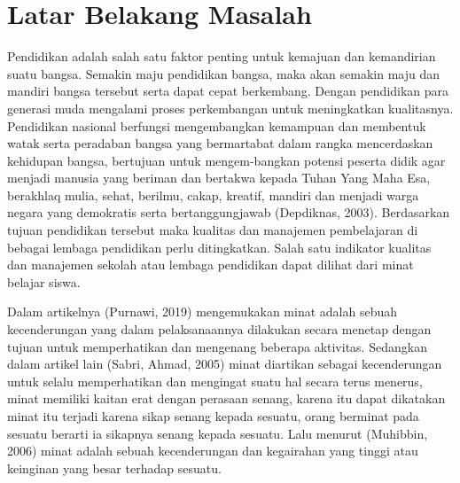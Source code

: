 \section{Latar Belakang Masalah}

Pendidikan adalah salah satu faktor penting untuk kemajuan dan kemandirian suatu bangsa. Semakin maju pendidikan bangsa, maka akan semakin maju dan mandiri bangsa tersebut serta dapat cepat berkembang. Dengan pendidikan para generasi muda mengalami proses perkembangan untuk meningkatkan kualitasnya. Pendidikan nasional berfungsi mengembangkan kemampuan dan membentuk watak serta peradaban bangsa yang bermartabat dalam rangka mencerdaskan kehidupan bangsa, bertujuan untuk mengem-bangkan potensi peserta didik agar menjadi manusia yang beriman dan bertakwa kepada Tuhan Yang Maha Esa, berakhlaq mulia, sehat, berilmu, cakap, kreatif, mandiri dan menjadi warga negara yang demokratis serta bertanggungjawab (Depdiknas, 2003). Berdasarkan tujuan pendidikan tersebut maka kualitas dan manajemen pembelajaran di bebagai lembaga pendidikan perlu ditingkatkan. Salah satu indikator kualitas dan manajemen sekolah atau lembaga pendidikan dapat dilihat dari minat belajar siswa.

Dalam artikelnya (Purnawi, 2019) mengemukakan minat adalah sebuah kecenderungan yang dalam  pelaksanaannya  dilakukan  secara  menetap  dengan  tujuan  untuk  memperhatikan  dan mengenang  beberapa  aktivitas.  Sedangkan  dalam artikel lain (Sabri, Ahmad, 2005) minat  diartikan  sebagai kecenderungan untuk selalu memperhatikan dan mengingat suatu hal secara terus menerus, minat memiliki kaitan erat dengan perasaan senang, karena itu dapat dikatakan minat itu terjadi karena sikap senang kepada sesuatu, orang berminat pada sesuatu berarti ia sikapnya senang kepada sesuatu. Lalu menurut (Muhibbin, 2006) minat adalah sebuah kecenderungan dan kegairahan yang tinggi atau keinginan yang besar terhadap sesuatu. 





